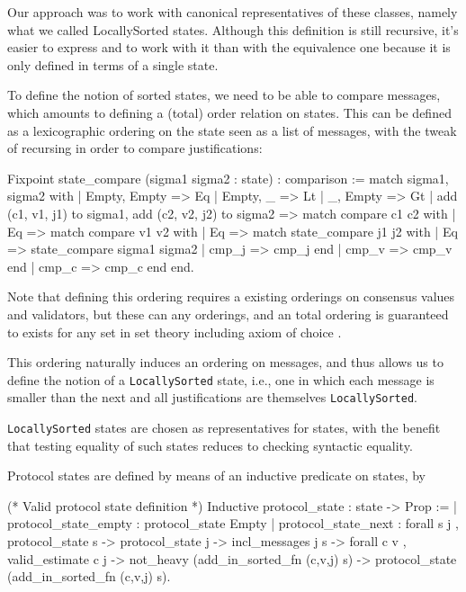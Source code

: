 Our approach was to work with canonical representatives of these classes,
namely what we called LocallySorted states.  Although this definition
is still recursive, it's easier to express and to work with it than with the
equivalence one because it is only defined in terms of a single state.

To define the notion of sorted states, we need to be able to compare messages,
which amounts to defining a (total) order relation on states.
This can be defined as a lexicographic ordering on the state seen as a list
of messages, with the tweak of recursing in order to compare justifications:

\begin{coq}
Fixpoint state_compare (sigma1 sigma2 : state) : comparison :=
  match sigma1, sigma2 with
  | Empty, Empty => Eq
  | Empty, _ => Lt
  | _, Empty => Gt
  | add (c1, v1, j1) to sigma1, add (c2, v2, j2) to sigma2 =>
    match compare c1 c2 with
    | Eq =>
      match compare v1 v2 with
      | Eq =>
        match state_compare j1 j2 with
        | Eq => state_compare sigma1 sigma2
        | cmp_j => cmp_j
        end
      | cmp_v => cmp_v
      end
    | cmp_c => cmp_c
    end
  end.
\end{coq}

Note that defining this ordering requires a existing orderings on
consensus values and validators, but these can any orderings,
and an total ordering is guaranteed to exists for any set in set theory
including axiom of choice \cite{Gonzalez}.
    
This ordering naturally induces an ordering on messages, and thus allows us
to define the notion of a \verb"LocallySorted" state, i.e., one in which
each message is smaller than the next and all justifications are themselves
\verb"LocallySorted".

\verb"LocallySorted" states are chosen as representatives for states, with the
benefit that testing equality of such states reduces to checking syntactic
equality.

Protocol states are defined by means of an inductive predicate on states, by

\begin{coq}
(* Valid protocol state definition *) 
Inductive protocol_state : state -> Prop :=
  | protocol_state_empty : protocol_state Empty
  | protocol_state_next
         : forall s j
         , protocol_state s
        -> protocol_state j
        -> incl_messages j s
        -> forall c v
         , valid_estimate c j
        -> not_heavy (add_in_sorted_fn (c,v,j) s)
        -> protocol_state (add_in_sorted_fn (c,v,j) s).
\end{coq}

